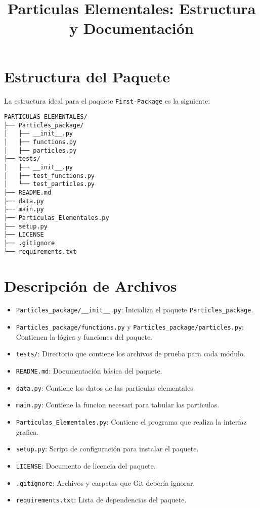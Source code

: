 \documentclass{article}
\title{Particulas Elementales: Estructura y Documentación}
\begin{document}
\maketitle
\section{Estructura del Paquete}
La estructura ideal para el paquete \texttt{First-Package} es la siguiente:

\begin{verbatim}
PARTICULAS ELEMENTALES/
├── Particles_package/
│   ├── __init__.py
│   ├── functions.py
│   ├── particles.py
├── tests/
│   ├── __init__.py
│   ├── test_functions.py
│   └── test_particles.py
├── README.md
├── data.py
├── main.py
├── Particulas_Elementales.py
├── setup.py
├── LICENSE
├── .gitignore
└── requirements.txt
\end{verbatim}

\section{Descripción de Archivos}
\begin{itemize}
    \item \texttt{Particles_package/\_\_init\_\_.py}: Inicializa el paquete \texttt{Particles_package}.
    \item \texttt{Particles_package/functions.py} y \texttt{Particles_package/particles.py}: Contienen la lógica y funciones del paquete.
    \item \texttt{tests/}: Directorio que contiene los archivos de prueba para cada módulo.
    \item \texttt{README.md}: Documentación básica del paquete.
    \item \texttt{data.py}: Contiene los datos de las particulas elementales.
    \item \texttt{main.py}: Contiene la funcion necesari para tabular las particulas.
    \item \texttt{Particulas_Elementales.py}: Contiene el programa que realiza la interfaz grafica.
    \item \texttt{setup.py}: Script de configuración para instalar el paquete.
    \item \texttt{LICENSE}: Documento de licencia del paquete.
    \item \texttt{.gitignore}: Archivos y carpetas que Git debería ignorar.
    \item \texttt{requirements.txt}: Lista de dependencias del paquete.
\end{itemize}
\end{document}
